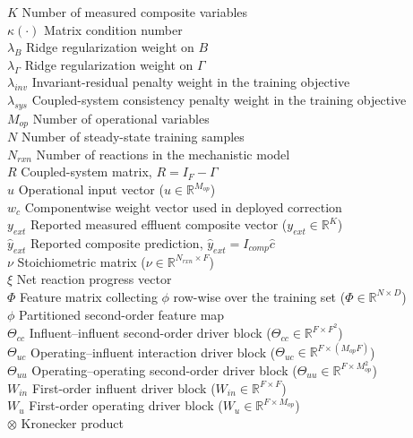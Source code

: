 \documentclass[a4paper,fleqn]{cas-sc}
\newenvironment{revblockr110}{\begingroup\color{revRoneTen}}{\endgroup}
\begin{document}
\begin{revblockr110}
\begin{tabbing}
$K$ \> Number of measured composite variables \\
$\kappa(\cdot)$ \> Matrix condition number \\
$\lambda_B$ \> Ridge regularization weight on $B$ \\
$\lambda_\Gamma$ \> Ridge regularization weight on $\Gamma$ \\
$\lambda_{inv}$ \> Invariant-residual penalty weight in the training objective \\
$\lambda_{sys}$ \> Coupled-system consistency penalty weight in the training objective \\
$M_{op}$ \> Number of operational variables \\
$N$ \> Number of steady-state training samples \\
$N_{rxn}$ \> Number of reactions in the mechanistic model \\
$R$ \> Coupled-system matrix, $R = I_F - \Gamma$ \\
$u$ \> Operational input vector ($u \in \mathbb{R}^{M_{op}}$) \\
$w_c$ \> Componentwise weight vector used in deployed correction \\
$y_{ext}$ \> Reported measured effluent composite vector ($y_{ext} \in \mathbb{R}^{K}$) \\
$\hat{y}_{ext}$ \> Reported composite prediction, $\hat{y}_{ext} = I_{comp}\hat{c}$ \\
$\nu$ \> Stoichiometric matrix ($\nu \in \mathbb{R}^{N_{rxn} \times F}$) \\
$\xi$ \> Net reaction progress vector \\
$\Phi$ \> Feature matrix collecting $\phi$ row-wise over the training set ($\Phi \in \mathbb{R}^{N \times D}$) \\
$\phi$ \> Partitioned second-order feature map \\
$\Theta_{cc}$ \> Influent--influent second-order driver block ($\Theta_{cc} \in \mathbb{R}^{F \times F^2}$) \\
$\Theta_{uc}$ \> Operating--influent interaction driver block ($\Theta_{uc} \in \mathbb{R}^{F \times (M_{op}F)}$) \\
$\Theta_{uu}$ \> Operating--operating second-order driver block ($\Theta_{uu} \in \mathbb{R}^{F \times M_{op}^2}$) \\
$W_{in}$ \> First-order influent driver block ($W_{in} \in \mathbb{R}^{F \times F}$) \\
$W_u$ \> First-order operating driver block ($W_u \in \mathbb{R}^{F \times M_{op}}$) \\
$\otimes$ \> Kronecker product \\
\end{tabbing}
\end{revblockr110}
\end{document}
